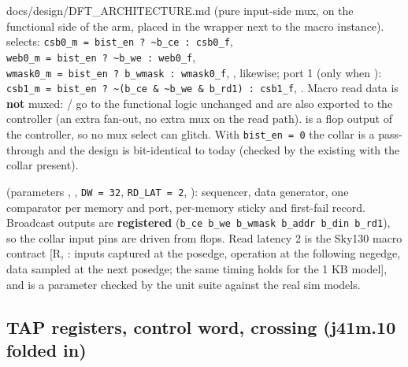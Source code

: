 \begin{relocated}{docs/design/DFT_ARCHITECTURE.md}
\textbf{} (pure input-side mux, on the functional side
of the  arm, placed in the wrapper next to the macro
instance).  selects:
\texttt{csb0\_\allowbreak{}m\ =\allowbreak{}\ bist\_\allowbreak{}en\ ?\ \textasciitilde{}b\_\allowbreak{}ce\ :\allowbreak{}\ csb0\_\allowbreak{}f},
\texttt{web0\_\allowbreak{}m\ =\allowbreak{}\ bist\_\allowbreak{}en\ ?\ \textasciitilde{}b\_\allowbreak{}we\ :\allowbreak{}\ web0\_\allowbreak{}f},
\texttt{wmask0\_\allowbreak{}m\ =\allowbreak{}\ bist\_\allowbreak{}en\ ?\ b\_\allowbreak{}wmask\ :\allowbreak{}\ wmask0\_\allowbreak{}f},
,  likewise; port 1 (only when
):
\texttt{csb1\_\allowbreak{}m\ =\allowbreak{}\ bist\_\allowbreak{}en\ ?\ \textasciitilde{}(b\_\allowbreak{}ce\ \&\ \textasciitilde{}b\_\allowbreak{}we\ \&\ b\_\allowbreak{}rd1)\ :\allowbreak{}\ csb1\_\allowbreak{}f},
. Macro read data is \textbf{not} muxed:
/ go to the functional logic unchanged and are
also exported to the controller (an extra fan-out, no extra mux on the
read path).  is a flop output of the controller, so no
mux select can glitch. With
\texttt{bist\_\allowbreak{}en\ =\allowbreak{}\ 0} the collar is a
pass-through and the design is bit-identical to today (checked by the
existing  with the collar present).

\textbf{} (parameters , ,
\texttt{DW\ =\allowbreak{}\ 32},
\texttt{RD\_\allowbreak{}LAT\ =\allowbreak{}\ 2}, ):
sequencer, data generator, one comparator per memory and port,
per-memory sticky  and first-fail record. Broadcast outputs
are \textbf{registered}
(\texttt{b\_\allowbreak{}ce\ b\_\allowbreak{}we\ b\_\allowbreak{}wmask\ b\_\allowbreak{}addr\ b\_\allowbreak{}din\ b\_\allowbreak{}rd1}),
so the collar input pins are driven from flops. Read latency 2 is the
Sky130 macro contract {[}R,
: inputs captured at the
posedge, operation at the following negedge, data sampled at the next
posedge; the same timing holds for the 1 KB model{]}, and is a parameter
checked by the unit suite against the real sim models.

\subsection{TAP registers, control word, crossing (j41m.10 folded
in)}\label{tm:ch:dft-architecture:165-tap-registers-control-word-crossing-j41m10-folded-in}


\end{relocated}
